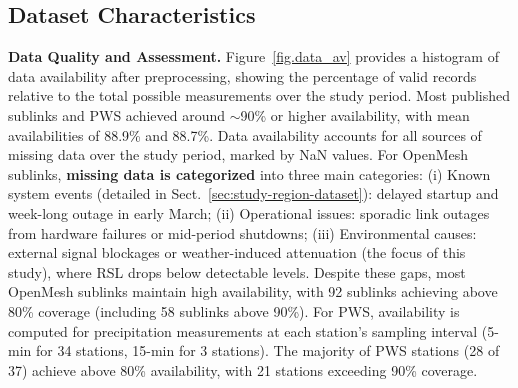 \documentclass[manuscript]{copernicus}
\begin{document}
\subsection{Dataset Characteristics}\label{sec:data_quality}

\textbf{Data Quality and Assessment.}
Figure~\ref{fig.data_av} provides a histogram of data availability after preprocessing, showing the percentage of valid records relative to the total possible measurements over the study period.
Most published sublinks and PWS achieved around $\sim$90\% or higher availability, with mean availabilities of 88.9\% and 88.7\%. 
Data availability accounts for all sources of missing data over the study period, marked by NaN values. For OpenMesh sublinks, \textbf{missing data is categorized} into three main categories: (i) Known system events (detailed in Sect.~\ref{sec:study-region-dataset}): delayed startup and week-long outage in early March; (ii) Operational issues: sporadic link outages from hardware failures or mid-period shutdowns; (iii) Environmental causes: external signal blockages or weather-induced attenuation (the focus of this study), where RSL drops below detectable levels.
 Despite these gaps, most OpenMesh sublinks maintain high availability, with 92 sublinks achieving above 80\% coverage (including 58 sublinks above 90\%).
For PWS, availability is computed for precipitation measurements at each station's sampling interval (5-min for 34 stations, 15-min for 3 stations). 
The majority of PWS stations (28 of 37) achieve above 80\% availability, with 21 stations exceeding 90\% coverage. 
\end{document}
